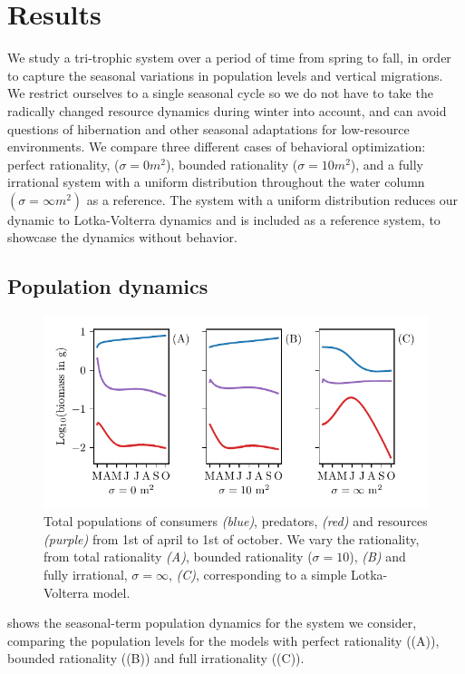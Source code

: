 \section{Results}
We study a tri-trophic system over a period of time from spring to fall, in order to capture the seasonal variations in population levels and vertical migrations. We restrict ourselves to a single seasonal cycle so we do not have to take the radically changed resource dynamics during winter into account, and can avoid questions of hibernation and other seasonal adaptations for low-resource environments. We compare three different cases of behavioral optimization: perfect rationality, ($\sigma = 0 m^2$), bounded rationality ($\sigma = 10 m^2$), and a fully irrational system with a uniform distribution throughout the water column $(\sigma = \infty m^2)$ as a reference. The system with a uniform distribution reduces our dynamic to Lotka-Volterra dynamics and is included as a reference system, to showcase the dynamics without behavior.

\subsection{Population dynamics}
\begin{figure}[H]
\includegraphics{plots/populations.pdf}
\caption{Total populations of consumers \emph{(blue)}, predators, \emph{(red)} and resources \emph{(purple)} from 1st of april to 1st of october. We vary the rationality, from total rationality \emph{(A)}, bounded rationality ($\sigma = 10$), \emph{(B)} and fully irrational, $\sigma = \infty$, \emph{(C)}, corresponding to a simple Lotka-Volterra model.}
\label{fig:long_term_populations}
\end{figure}
 shows the seasonal-term population dynamics for the system we consider, comparing the population levels for the models with perfect rationality ((A)), bounded rationality ((B)) and full irrationality ((C)).

